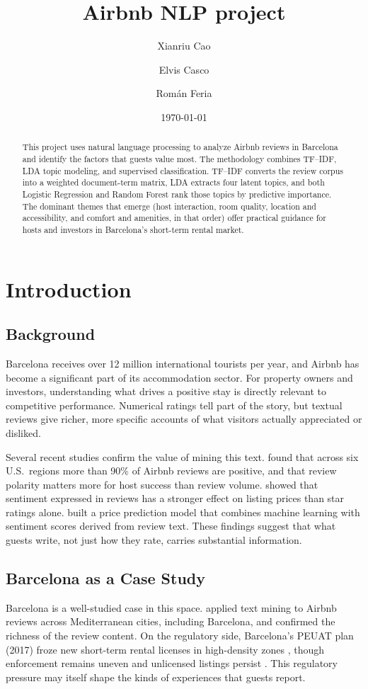 \documentclass[11pt]{article}
\title{Airbnb NLP project}
\author{
Xianriu Cao \and Elvis Casco \and Rom\'{a}n Feria
}
\date{\today}
\begin{document}
\maketitle

\begin{abstract}
This project uses natural language processing to analyze Airbnb reviews in Barcelona and identify the factors that guests value most. The methodology combines TF--IDF, LDA topic modeling, and supervised classification. TF--IDF converts the review corpus into a weighted document-term matrix, LDA extracts four latent topics, and both Logistic Regression and Random Forest rank those topics by predictive importance. The dominant themes that emerge (host interaction, room quality, location and accessibility, and comfort and amenities, in that order) offer practical guidance for hosts and investors in Barcelona's short-term rental market.
\end{abstract}

\section{Introduction}

\subsection{Background}
Barcelona receives over 12 million international tourists per year, and Airbnb has become a significant part of its accommodation sector. For property owners and investors, understanding what drives a positive stay is directly relevant to competitive performance. Numerical ratings tell part of the story, but textual reviews give richer, more specific accounts of what visitors actually appreciated or disliked.

Several recent studies confirm the value of mining this text. \citet{safari2025sentiment} found that across six U.S.\ regions more than 90\% of Airbnb reviews are positive, and that review polarity matters more for host success than review volume. \citet{becerra2025reviews} showed that sentiment expressed in reviews has a stronger effect on listing prices than star ratings alone. \citet{perezsanchez2023sustainable} built a price prediction model that combines machine learning with sentiment scores derived from review text. These findings suggest that what guests write, not just how they rate, carries substantial information.

\subsection{Barcelona as a Case Study}
Barcelona is a well-studied case in this space. \citet{fernandezmorales2025mapping} applied text mining to Airbnb reviews across Mediterranean cities, including Barcelona, and confirmed the richness of the review content. On the regulatory side, Barcelona's PEUAT plan (2017) froze new short-term rental licenses in high-density zones \citep{ajuntament2017peuat}, though enforcement remains uneven and unlicensed listings persist \citep{seguillinares2019monitoring}. This regulatory pressure may itself shape the kinds of experiences that guests report.
\end{document}
